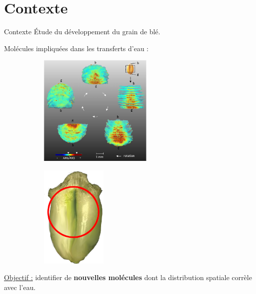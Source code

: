 \documentclass[10pt]{beamer}
\begin{document}
\section{Contexte}
\begin{frame}{Contexte}
  Étude du développement du grain de blé.
  
  Molécules impliquées dans les transferts d'eau \cite{Fanuel18} :
  
  
  \begin{figure}[ht]
    \centering
    \begin{subfigure}[t]{0.45\textwidth}
      \centering
      \includegraphics[width=0.6\textwidth]{fig/3Darabinoxylan}
      \label{subfig:3Darabinoxylan}
    \end{subfigure}%
    \begin{subfigure}[t]{0.45\textwidth}
      \centering
      \includegraphics[width=0.35\textwidth]{fig/water_transfer}
      \label{subfig:water_transfer}
    \end{subfigure}%
  \end{figure}

   \underline{Objectif :} identifier de \textbf{nouvelles molécules} dont la distribution spatiale corrèle avec l'eau.\\

\end{frame}
\end{document}

